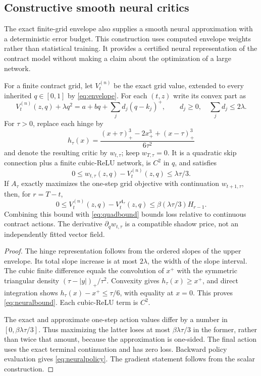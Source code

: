 \subsection{Constructive smooth neural critics}
The exact finite-grid envelope also supplies a smooth neural approximation with a deterministic error budget. This construction uses computed envelope weights rather than statistical training. It provides a certified neural representation of the contract model without making a claim about the optimization of a large network.

\begin{corollary}\label{cor:neural}
For a finite contract grid, let $V_t^{(n)}$ be the exact grid value, extended to every inherited $q\in[0,1]$ by \eqref{eq:envelope}. For each $(t,z)$ write its convex part as
\[
 V_t^{(n)}(z,q)+\lambda q^2=a+bq+\sum_j d_j(q-k_j)^+,
 \qquad d_j\geq0,\quad \sum_jd_j\leq2\lambda.
\]
For $\tau>0$, replace each hinge by
\[
 h_\tau(x)=\frac{(x+\tau)_+^3-2x_+^3+(x-\tau)_+^3}{6\tau^2}
\]
and denote the resulting critic by $w_{t,\tau}$; keep $w_{T,\tau}=0$. It is a quadratic skip connection plus a finite cubic-ReLU network, is $C^2$ in $q$, and satisfies
\begin{equation}\label{eq:neuralbound}
 0\leq w_{t,\tau}(z,q)-V_t^{(n)}(z,q)\leq\lambda\tau/3.
\end{equation}
If $A_\tau$ exactly maximizes the one-step grid objective with continuation $w_{t+1,\tau}$, then, for $r=T-t$,
\begin{equation}\label{eq:neuralpolicy}
 0\leq V_t^{(n)}(z,q)-V_t^{A_\tau}(z,q)
 \leq\beta(\lambda\tau/3)H_{r-1}.
\end{equation}
Combining this bound with \eqref{eq:quadbound} bounds loss relative to continuous contract actions. The derivative $\partial_qw_{t,\tau}$ is a compatible shadow price, not an independently fitted vector field.
\end{corollary}
\begin{proof}
The hinge representation follows from the ordered slopes of the upper envelope. Its total slope increase is at most $2\lambda$, the width of the slope interval. The cubic finite difference equals the convolution of $x^+$ with the symmetric triangular density $(\tau-|y|)_+/\tau^2$. Convexity gives $h_\tau(x)\geq x^+$, and direct integration shows $h_\tau(x)-x^+\leq\tau/6$, with equality at $x=0$. This proves \eqref{eq:neuralbound}. Each cubic-ReLU term is $C^2$.

The exact and approximate one-step action values differ by a number in $[0,\beta\lambda\tau/3]$. Thus maximizing the latter loses at most $\beta\lambda\tau/3$ in the former, rather than twice that amount, because the approximation is one-sided. The final action uses the exact terminal continuation and has zero loss. Backward policy evaluation gives \eqref{eq:neuralpolicy}. The gradient statement follows from the scalar construction.\end{proof}


